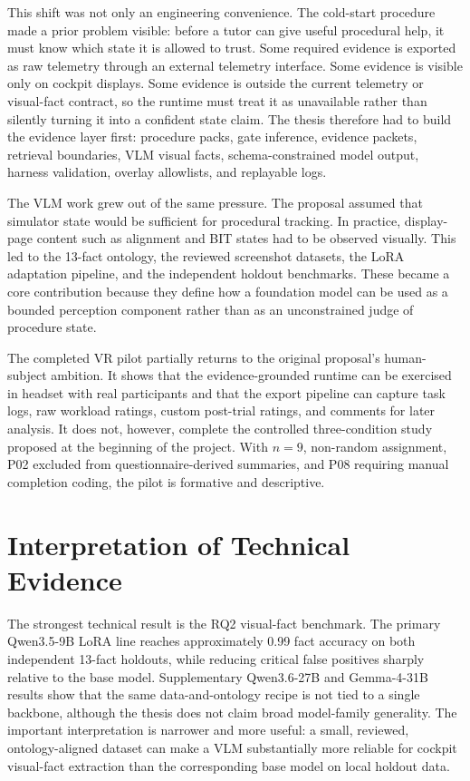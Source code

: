 This shift was not only an engineering convenience. The cold-start procedure
made a prior problem visible: before a tutor can give useful procedural help, it
must know which state it is allowed to trust. Some required evidence is exported
as raw telemetry through an external telemetry interface. Some evidence is visible only on cockpit
displays. Some evidence is outside the current telemetry or visual-fact
contract, so the runtime must treat it as unavailable rather than silently
turning it into a confident state claim. The thesis therefore had to build the
evidence layer first: procedure packs, gate inference, evidence packets,
retrieval boundaries, VLM visual facts, schema-constrained model output,
harness validation, overlay allowlists, and replayable logs.

The VLM work grew out of the same pressure. The proposal assumed that simulator
state would be sufficient for procedural tracking. In practice, display-page
content such as alignment and BIT states had to be observed visually. This led
to the 13-fact ontology, the reviewed screenshot datasets, the LoRA adaptation
pipeline, and the independent holdout benchmarks. These became a core
contribution because they define how a foundation model can be used as a bounded
perception component rather than as an unconstrained judge of procedure state.

The completed VR pilot partially returns to the original proposal's
human-subject ambition. It shows that the evidence-grounded runtime can be
exercised in headset with real participants and that the export pipeline can
capture task logs, raw workload ratings, custom post-trial ratings, and
comments for later analysis. It does not, however, complete the controlled
three-condition
study proposed at the beginning of the project. With $n=9$, non-random
assignment, P02 excluded from questionnaire-derived summaries, and P08 requiring
manual completion coding, the pilot is formative and descriptive.

\section{Interpretation of Technical Evidence}\label{sec:disc-interpretation}

The strongest technical result is the RQ2 visual-fact benchmark. The primary
Qwen3.5-9B LoRA line reaches approximately 0.99 fact accuracy on both
independent 13-fact holdouts, while reducing critical false positives sharply
relative to the base model. Supplementary Qwen3.6-27B and Gemma-4-31B results
show that the same data-and-ontology recipe is not tied to a single backbone,
although the thesis does not claim broad model-family generality. The important
interpretation is narrower and more useful: a small, reviewed, ontology-aligned
dataset can make a VLM substantially more reliable for cockpit visual-fact
extraction than the corresponding base model on local holdout data.

